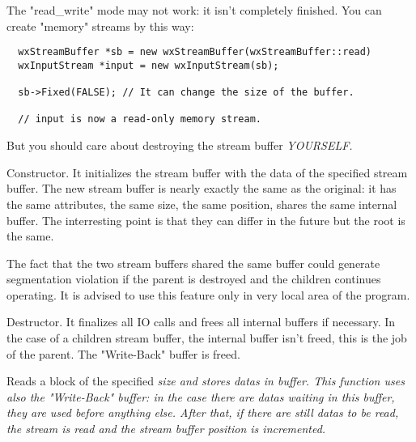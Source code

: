 The "read\_write" mode may not work: it isn't completely finished.
You can create "memory" streams by this way:
\begin{verbatim}
  wxStreamBuffer *sb = new wxStreamBuffer(wxStreamBuffer::read)
  wxInputStream *input = new wxInputStream(sb);

  sb->Fixed(FALSE); // It can change the size of the buffer.

  // input is now a read-only memory stream.
\end{verbatim}
But you should care about destroying the stream buffer \it{YOURSELF}.




Constructor. It initializes the stream buffer with the data of the specified
stream buffer. The new stream buffer is nearly exactly the same as the
original: it has the same attributes, the same size, the same position, shares
the same internal buffer. The interresting point is that they can differ
in the future but the root is the same.


The fact that the two stream buffers shared the same buffer could generate
segmentation violation if the parent is destroyed and the children continues
operating. It is advised to use this feature only in very local area of the
program.



Destructor. It finalizes all IO calls and frees all internal buffers if
necessary. In the case of a children stream buffer, the internal buffer isn't
freed, this is the job of the parent.
The "Write-Back" buffer is freed.

\label{wxstreambufferread}


Reads a block of the specified \it{size} and stores datas in \it{buffer}.
This function uses also the "Write-Back" buffer: in the case there are datas
waiting in this buffer, they are used before anything else. After that, if there
are still datas to be read, the stream is read and the stream buffer position
is incremented.

